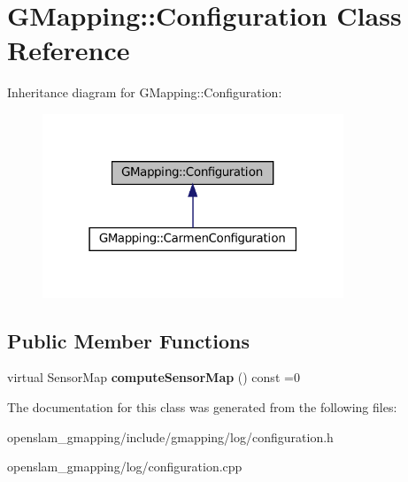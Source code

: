 \hypertarget{classGMapping_1_1Configuration}{}\section{G\+Mapping\+:\+:Configuration Class Reference}
\label{classGMapping_1_1Configuration}


Inheritance diagram for G\+Mapping\+:\+:Configuration\+:
\nopagebreak
\begin{figure}[H]
\begin{center}
\leavevmode
\includegraphics[width=255pt]{classGMapping_1_1Configuration__inherit__graph}
\end{center}
\end{figure}
\subsection*{Public Member Functions}
\begin{DoxyCompactItemize}
\item 
\mbox{\label{classGMapping_1_1Configuration_a3b95d050932e23425ceaa034041729a9}} 
virtual Sensor\+Map {\bfseries compute\+Sensor\+Map} () const =0
\end{DoxyCompactItemize}


The documentation for this class was generated from the following files\+:\begin{DoxyCompactItemize}
\item 
openslam\+\_\+gmapping/include/gmapping/log/configuration.\+h\item 
openslam\+\_\+gmapping/log/configuration.\+cpp\end{DoxyCompactItemize}
